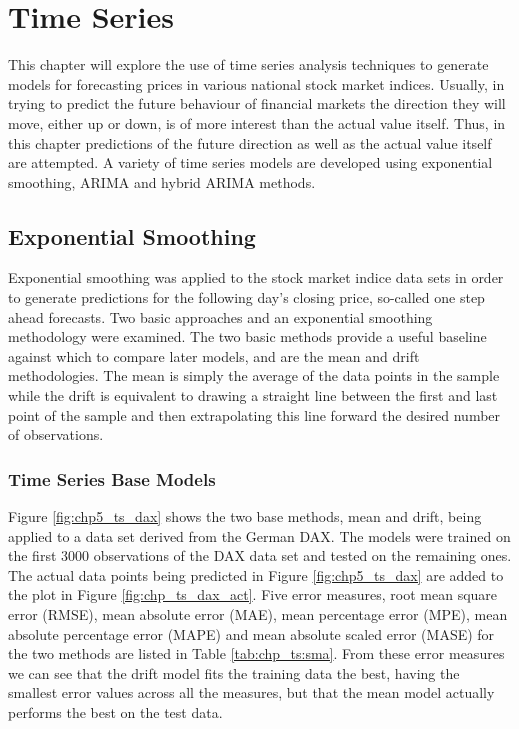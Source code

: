 
\chapter{Time Series} %

\label{Chapter5} %



This chapter will explore the use of time series analysis techniques to generate models for forecasting prices in various national stock market indices. Usually, in trying to predict the future behaviour of financial markets the direction they will move, either up or down, is of more interest than the actual value itself. Thus, in this chapter predictions of the future direction as well as the actual value itself are attempted.  A variety of time series models are developed using exponential smoothing, ARIMA and hybrid ARIMA methods.

\section{Exponential Smoothing}

Exponential smoothing was applied to the stock market indice data sets in order to generate predictions for the following day's closing price, so-called one step ahead forecasts. Two basic approaches and an exponential smoothing methodology were examined. The two basic methods provide a useful baseline against which to compare later models, and are the mean and drift methodologies. The mean is simply the average of the data points in the sample while the drift is equivalent to drawing a straight line between the first and last point of the sample and then extrapolating this line forward the desired number of observations.

\subsection{Time Series Base Models}
Figure \ref{fig:chp5_ts_dax} shows the two base methods, mean and drift, being applied to a data set derived from the German DAX. The models were trained on the first 3000 observations of the DAX data set and tested on the remaining ones. The actual data points being predicted in Figure \ref{fig:chp5_ts_dax} are added to the plot in Figure \ref{fig:chp_ts_dax_act}. Five error measures, root mean square error (RMSE), mean absolute error (MAE), mean percentage error (MPE), mean absolute percentage error (MAPE) and mean absolute scaled error (MASE) for the two methods are listed in Table \ref{tab:chp_ts:sma}. From these error measures we can see that the drift model fits the training data the best, having the smallest error values across all the measures, but that the mean model actually performs the best on the test data.


